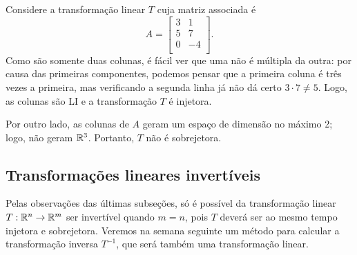 \documentclass[../livro.tex]{subfiles}
\begin{document}
\begin{example}\label{exp:injsob2}
Considere a transformação linear $T$ cuja matriz associada é
\begin{equation}
A = \left[
  \begin{array}{rrrr}
    3  & 1 \\
    5  & 7 \\
    0  & -4 \\
  \end{array}
\right].
\end{equation} Como são somente duas colunas, é fácil ver que uma não é múltipla da outra: por causa das primeiras componentes, podemos pensar que a primeira coluna é três vezes a primeira, mas verificando a segunda linha já não dá certo $3\cdot 7 \neq 5$. Logo, as colunas são LI e a transformação $T$ é injetora.

Por outro lado,  as colunas de $A$ geram um espaço de dimensão no máximo 2; logo, não geram $\mathbb{R}^3$. Portanto, $T$ não é sobrejetora.
\end{example}


\subsection{Transformações lineares invertíveis}

Pelas observações das últimas subseções, só é possível da transformação linear $T: \mathbb{R}^n \to \mathbb{R}^m$ ser invertível quando $m=n$, pois $T$ deverá ser ao mesmo tempo injetora e sobrejetora. Veremos na semana seguinte um método para calcular a transformação inversa $T^{-1}$, que será também uma transformação linear.
\end{document}
